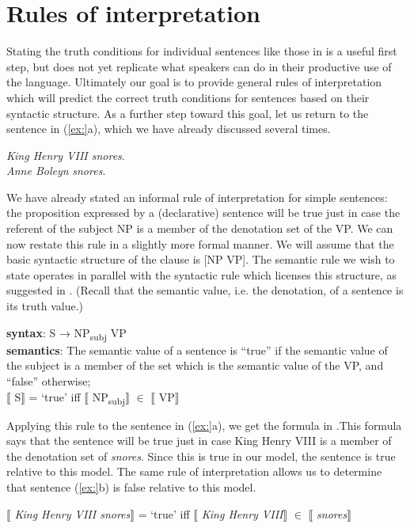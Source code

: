 \section{Rules of interpretation}\label{sec:13.5}

Stating the truth conditions for individual sentences like those in  is a useful first step, but does not yet replicate what speakers can do in their productive use of the language. Ultimately our goal is to provide general rules of interpretation which will predict the correct truth conditions for sentences based on their syntactic structure. As a further step toward this goal, let us return to the sentence in (\ref{ex:}a), which we have already discussed several times.


\ea
\ea \textit{King Henry VIII snores}.\\
\ex \textit{Anne Boleyn} \textit{snores}.
                       \z
\z


We have already stated an informal rule of interpretation for simple sentences: the proposition expressed by a (declarative) sentence will be true just in case the referent of the subject NP is a member of the denotation set of the VP. We can now restate this rule in a slightly more formal manner. We will assume that the basic syntactic structure of the clause is [NP VP]. The semantic rule we wish to state operates in parallel with the syntactic rule which licenses this structure, as suggested in . (Recall that the semantic value, i.e. the denotation, of a sentence is its truth value.)


\ea
\textbf{syntax}: S  →  NP\textsubscript{subj}  VP\\
\textbf{semantics}: The semantic value of a sentence is “true” if the semantic value of the subject is a member of the set which is the semantic value of the VP, and “false” otherwise;\\
{}$\llbracket$ S$\rrbracket$  = ‘true’  iff  $\llbracket$ NP\textsubscript{subj}$\rrbracket$  ${\in}$ $\llbracket$ VP$\rrbracket$ 
\z


Applying this rule to the sentence in (\ref{ex:}a), we get the formula in .This formula says that the sentence will be true just in case King Henry VIII is a member of the denotation set of \textit{snores}. Since this is true in our model, the sentence is true relative to this model. The same rule of interpretation allows us to determine that sentence (\ref{ex:}b) is false relative to this model.


\ea
{}$\llbracket$ \textit{King Henry VIII snores}$\rrbracket$  = ‘true’  iff  $\llbracket$ \textit{King Henry VIII}$\rrbracket$  ${\in}$ $\llbracket$ \textit{snores}$\rrbracket$ 
\z


